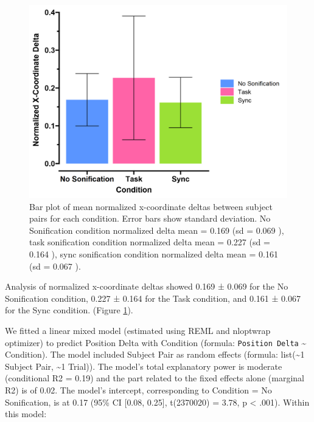 \documentclass[10pt,a4paper,onecolumn]{article}
\begin{document}
\begin{figure}[h]

{\centering \includegraphics[width=1\linewidth]{figures/parwise_position_delta} 

}

\caption{Bar plot of mean normalized x-coordinate deltas between subject pairs for each condition. Error bars show standard deviation. No Sonification condition normalized delta mean  =  0.169 (sd =  0.069 ), task sonification condition normalized delta mean =  0.227 (sd =  0.164 ), sync sonification condition normalized delta mean =  0.161 (sd =  0.067 ).}\label{fig:pairwise-position-delta}
\end{figure}

Analysis of normalized x-coordinate deltas showed 0.169 ± 0.069 for the No Sonification condition,
0.227 ± 0.164 for the Task condition, and
0.161 ± 0.067 for the Sync condition. (Figure \ref{fig:pairwise-position-delta}).

We fitted a linear mixed model (estimated using REML and nloptwrap optimizer) to predict Position Delta with Condition (formula: \texttt{Position\ Delta} \textasciitilde{} Condition). The model included Subject Pair as random effects (formula: list(\textasciitilde1 \textbar{} Subject Pair, \textasciitilde1 \textbar{} Trial)). The model's total explanatory power is moderate (conditional R2 = 0.19) and the part related to the fixed effects alone (marginal R2) is of 0.02. The model's intercept, corresponding to Condition = No Sonification, is at 0.17 (95\% CI {[}0.08, 0.25{]}, t(2370020) = 3.78, p \textless{} .001). Within this model:
\end{document}
